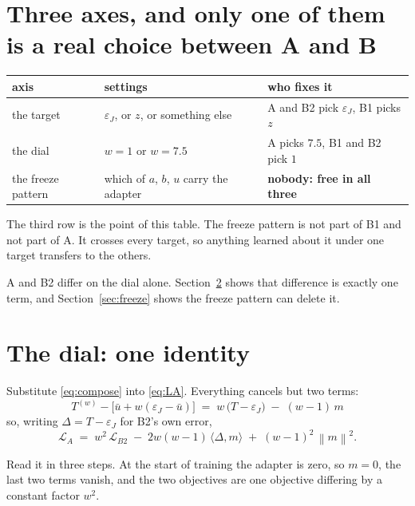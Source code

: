 \documentclass[11pt]{article}
\newcommand{\eps}{\varepsilon}
\newcommand{\norm}[1]{\left\lVert #1 \right\rVert}
\begin{document}
\section{Three axes, and only one of them is a real choice between A and B}
\label{sec:axes}

\begin{center}
\small
\begin{tabular}{p{} p{} p{}}
\toprule
axis & settings & who fixes it \\
\midrule
the target & $\eps_J$, or $z$, or something else & A and B2 pick $\eps_J$, B1 picks $z$ \\
the dial & $w = 1$ or $w = 7.5$ & A picks $7.5$, B1 and B2 pick $1$ \\
the freeze pattern & which of $a$, $b$, $u$ carry the adapter & \textbf{nobody: free in all three} \\
\bottomrule
\end{tabular}
\end{center}

The third row is the point of this table. The freeze pattern is not part of B1 and not part of A.
It crosses every target, so anything learned about it under one target transfers to the others.

A and B2 differ on the dial alone. Section~\ref{sec:dial} shows that difference is exactly one term,
and Section~\ref{sec:freeze} shows the freeze pattern can delete it.

\section{The dial: one identity}
\label{sec:dial}

Substitute \eqref{eq:compose} into \eqref{eq:LA}. Everything cancels but two terms:
\begin{equation}
  \boxed{\;
  T^{(w)} - \big[\bar u + w(\eps_J - \bar u)\big]
  \;=\; w\,\big(T - \eps_J\big) \;-\; (w-1)\,m
  \;}
  \label{eq:key}
\end{equation}
so, writing $\Delta = T - \eps_J$ for B2's own error,
\begin{equation}
  \mathcal{L}_A \;=\; w^2\,\mathcal{L}_{B2}
  \;-\; 2w(w-1)\,\langle \Delta, m\rangle
  \;+\; (w-1)^2\,\norm{m}^2 .
  \label{eq:expand}
\end{equation}

Read it in three steps. At the start of training the adapter is zero, so $m = 0$, the last two terms
vanish, and the two objectives are one objective differing by a constant factor $w^2$.
\end{document}
